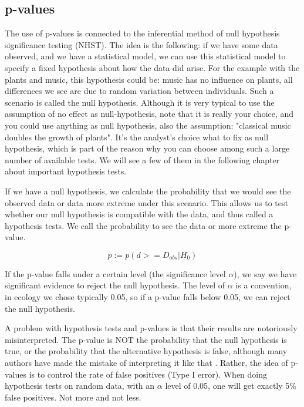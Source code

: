 \documentclass[a4paper,twoside]{tufte-book}\usepackage[]{graphicx}\usepackage[]{color}
\begin{document}
{\subsection{p-values}

The use of p-values is connected to the inferential method of null hypothesis significance testing (NHST). The idea is the following: if we have some data observed, and we have a statistical model, we can use this statistical model to specify a fixed hypothesis about how the data did arise. For the example with the plants and music, this hypothesis could be: music has no influence on plants, all differences we see are due to random variation between individuals. Such a scenario is called the null hypothesis.  Although it is very typical to use the assumption of no effect as null-hypothesis, note that it is really your choice, and you could use anything as null hypothesis, also the assumption: "classical music doubles the growth of plants". It's the analyst's choice what to fix as null hypothesis, which is part of the reason why you can choose among such a large number of available tests. We will see a few of them in the following chapter about important hypothesis tests.

If we have a null hypothesis, we calculate the probability that we would see the observed data or data more extreme under this scenario. This allows us to test whether our null hypothesis is compatible with the data, and thus called a hypothesis tests. We call the probability to see the data or more extreme the p-value.  

\begin{equation}
p := p(d >= D_{obs} | H_0)
\end{equation}

If the p-value falls under a certain level (the significance level $\alpha$), we say we have significant evidence to reject the null hypothesis. The level of $\alpha$ is a convention, in ecology we chose typically 0.05, so if a p-value falls below 0.05, we can reject the null hypothesis.  

A problem with hypothesis tests and p-values is that their results are notoriously misinterpreted. The p-value is NOT the probability that the null hypothesis is true, or the probability that the alternative hypothesis is false, although many authors have made the mistake of interpreting it like that \citep[][]{Cohen-earthisround-1994}. Rather, the idea of p-values is to control the rate of false positives (Type I error). When doing hypothesis tests on random data, with an $\alpha$ level of 0.05, one will get exactly 5\% false positives. Not more and not less.  

}
\end{document}
